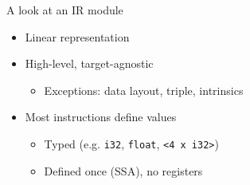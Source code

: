 \begin{frame}[fragile]{A look at an IR module}

\begin{itemize}
    \item Linear representation
    \item High-level, target-agnostic
    \begin{itemize}
        \item Exceptions: data layout, triple, intrinsics
    \end{itemize}
    \item Most instructions define values
    \begin{itemize}
        \item Typed (e.g. \texttt{i32}, \texttt{float}, \texttt{<4 x i32>})
        \item Defined once (SSA), no registers
    \end{itemize}
\end{itemize}



\end{frame}


